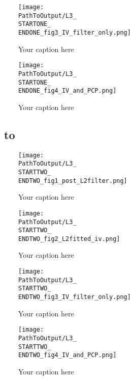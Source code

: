 \begin{appendix}
\begin{figure}[H] %
  \centering
  \texttt{[image: \\PathToOutput/L3\_\\STARTONE\_\\ENDONE\_fig3\_IV\_filter\_only.png]}%
  \caption{Your caption here}
 \label{fig:time1lvl3fig3}
\end{figure}


\begin{figure}[H] %
  \centering
  \texttt{[image: \\PathToOutput/L3\_\\STARTONE\_\\ENDONE\_fig4\_IV\_and\_PCP.png]}%
  \caption{Your caption here}
 \label{fig:time1lvl3fig4}
\end{figure}

\newpage
\subsection{\STARTTWO\ to \ENDTWO }

\begin{figure}[H] %
  \centering
  \texttt{[image: \\PathToOutput/L3\_\\STARTTWO\_\\ENDTWO\_fig1\_post\_L2filter.png]}%
  \caption{Your caption here}
  \label{fig:time2lvl3fig1}
\end{figure}


\begin{figure}[H] %
  \centering
  \texttt{[image: \\PathToOutput/L3\_\\STARTTWO\_\\ENDTWO\_fig2\_L2fitted\_iv.png]}%
  \caption{Your caption here}
  \label{fig:time2lvl3fig2}
\end{figure}


\begin{figure}[H] %
  \centering
  \texttt{[image: \\PathToOutput/L3\_\\STARTTWO\_\\ENDTWO\_fig3\_IV\_filter\_only.png]}%
  \caption{Your caption here}
  \label{fig:time2lvl3fig3}
\end{figure}


\begin{figure}[H] %
  \centering
  \texttt{[image: \\PathToOutput/L3\_\\STARTTWO\_\\ENDTWO\_fig4\_IV\_and\_PCP.png]}%
  \caption{Your caption here}
  \label{fig:time2lvl3fig4}
\end{figure}

\newpage


\end{appendix}


